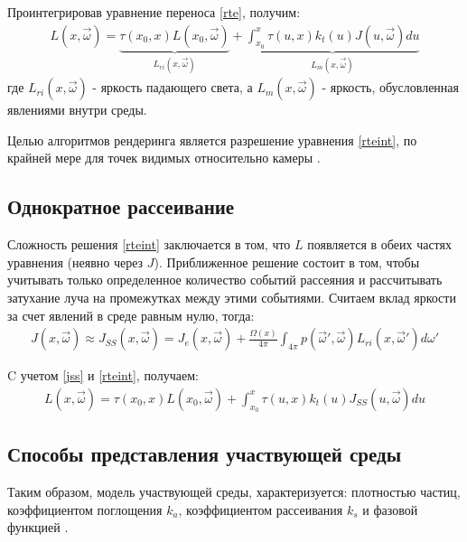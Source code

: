 Проинтегрировав уравнение переноса \ref{rte}, получим:
\begin{equation}
	\label{rteint}
	\begin{aligned}
		L(x, \vec{\omega}) =
		\underbrace{\tau(x_0, x) L(x_0, \vec{\omega})}_{L_{ri}(x, \vec{\omega})} + \underbrace{\int_{x_0}^{x} \tau(u, x) k_t(u) J(u, \vec{\omega}) du}_{L_m(x, \vec{\omega})}
	\end{aligned}
\end{equation}
где $ L_{ri}(x, \vec{\omega}) $ - яркость падающего света, а $ L_m(x, \vec{\omega}) $ - яркость, обусловленная явлениями внутри среды. 

Целью алгоритмов рендеринга является разрешение уравнения \ref{rteint}, по крайней мере для точек видимых относительно камеры \cite{partmedia}. 

\subsection{Однократное рассеивание}

Сложность решения \ref{rteint} заключается в том, что $L$ появляется в обеих частях уравнения (неявно через $J$). Приближенное решение состоит в том, чтобы учитывать только определенное количество событий рассеяния и рассчитывать затухание луча на промежутках между этими событиями. Считаем вклад яркости за счет явлений в среде равным нулю, тогда:
\begin{equation}
	\label{jss}
	\begin{aligned}
		J(x, \vec{\omega}) \approx J_{SS}(x, \vec{\omega}) = J_e(x, \vec{\omega}) + \frac{\Omega(x)}{4\pi} \int_{4\pi} p(\vec{\omega}', \vec{\omega}) L_{ri}(x, \vec{\omega}') d\omega'
	\end{aligned}
\end{equation}

C учетом \ref{jss} и \ref{rteint}, получаем:
\begin{equation}
	\label{rteintss}
	\begin{aligned}
		L(x, \vec{\omega}) =
		\tau(x_0, x) L(x_0, \vec{\omega}) + \int_{x_0}^{x} \tau(u, x) k_t(u) J_{SS}(u, \vec{\omega}) du
	\end{aligned}
\end{equation}

\subsection{Способы представления участвующей среды}
Таким образом, модель участвующей среды, характеризуется: плотностью частиц, коэффициентом поглощения $k_a$, коэффициентом рассеивания $k_s$ и фазовой функцией \cite{clouds}.

